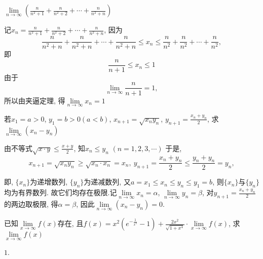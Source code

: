 \begin{problem}
	$\displaystyle \lim\limits_{n \rightarrow \infty}(\frac{n}{n^{2} + 1} + \frac{n}{n^{2} + 2} + \cdots + \frac{n}{n^{2} + n})$

\begin{solution} 
	记$\displaystyle x_{n} = \frac{n}{n^{2} + 1} + \frac{n}{n^{2} + 2} + \cdots + \frac{n}{n^{2} + n}$, 因为
	$$\frac{n}{n^{2} + n} + \frac{n}{n^{2} + n} + \cdots + \frac{n}{n^{2} + n} \leq x_{n} \leq \frac{n}{n^{2}} + \frac{n}{n^{2}} + \cdots + \frac{n}{n^{2}}, $$
即$$\frac{n}{n + 1} \leq x_{n} \leq 1$$
由于$$\lim\limits_{n \rightarrow \infty}\frac{n}{n + 1} = 1, $$ 所以由夹逼定理, 得$\lim\limits_{n \rightarrow \infty}x_{n} = 1$
\end{solution}

\end{problem}           

\begin{problem}
	若$x_{1} = a > 0$, $y_{1} = b > 0\left( a < b \right)$, $x_{n + 1} = \sqrt{x_{n}y_{n}}$, $\displaystyle y_{n + 1} = \frac{x_{n} + y_{n}}{2}$, 求$\lim\limits_{n \rightarrow \infty}(x_{n} - y_{n})$

\begin{solution} 
	由不等式$\displaystyle \sqrt{x \cdot y} \leq \frac{x + y}{2}$, 知$\displaystyle x_{n} \leq y_{n}\mspace{6mu}\left( n = 1, 2, 3, \cdots \right)$
于是, $$x_{n + 1} = \sqrt{x_{n}y_{n}} \geq \sqrt{x_{n} \cdot x_{n}} = x_{n}, \ y_{n + 1} = \frac{x_{n} + y_{n}}{2} \leq \frac{y_{n} + y_{n}}{2} = y_{n},$$

即, $\{ x_{n}\}$为递增数列, $\{ y_{n}\}$为递减数列, 
又$a = x_{1} \leq x_{n} \leq y_{n} \leq y_{1} = b$, 则$\{ x_{n}\}$与$\{ y_{n}\}$均为有界数列.
故它们均存在极限.记$\lim\limits_{n \rightarrow \infty}x_{n} = \alpha$, $\lim\limits_{n \rightarrow \infty}y_{n} = \beta$, 对$\displaystyle y_{n + 1} = \frac{x_{n} + y_{n}}{2}$的两边取极限, 得$\alpha = \beta$, 因此$\lim\limits_{n \rightarrow \infty}(x_{n} - y_{n}) = 0$.
\end{solution}


\end{problem}           

\begin{problem}
	已知$\lim\limits_{x \rightarrow \infty}f(x)$存在, 且$\displaystyle f(x) = x^{2}(e^{- \frac{1}{x^{2}}} - 1) + \frac{2x^{2}}{\sqrt{1 + x^{4}}} \cdot \lim\limits_{x \rightarrow \infty}f(x)$, 求$\lim\limits_{x \rightarrow \infty}f(x)$

\begin{solution} 
	$1$.
\end{solution}


\end{problem}           

